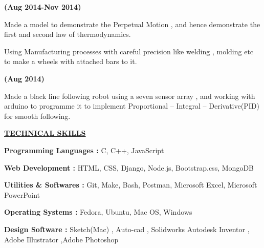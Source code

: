 \documentclass[letterpaper]{deedy-resume} %
\begin{document}
\begin{minipage}[t]{1.00\textwidth}
\microspace

\hfill {\textbf{(Aug 2014-Nov 2014)}}\\
\begin{tightitemize}
\item Made a model to demonstrate the Perpetual Motion , and hence demonstrate the first and second law of thermodynamics.
\item Using Manufacturing processes with careful precision like welding , molding etc to make a wheels with attached bars to it.
\end{tightitemize}

\microspace

\hfill {\textbf{(Aug 2014)}}\\
\begin{tightitemize}
\item Made a black line following robot using a seven sensor array , and working with arduino to programme it to implement Proportional – Integral – Derivative(PID) for smooth following.
\end{tightitemize}

\sectionspace

{\uppercase\uline{\textbf{\large{Technical Skills}}\hfill}}

\begin{tightitemize}
\item \textbf{Programming Languages :  }C, C++, JavaScript
\item \textbf{Web Development \hspace{28pt}: } HTML, CSS, Django, Node.js, Bootstrap.css, MongoDB
\item \textbf{Utilities \& Softwares \hspace{19pt}: } Git, Make, Bash, Postman, Microsoft Excel, Microsoft PowerPoint
\item \textbf{Operating Systems \hspace{27pt}: } Fedora, Ubuntu, Mac OS, Windows
\item \textbf{Design Software \hspace{28pt}:} Sketch(Mac) , Auto-cad , Solidworks Autodesk Inventor , Adobe Illustrator ,Adobe Photoshop
\end{tightitemize}
\sectionspace


\end{minipage}
\end{document}
